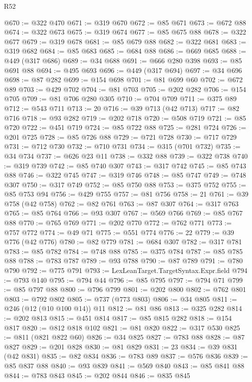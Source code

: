 \begin{lexlean}{R52}
\begin{coremodule}
@670 := @322 @470
@671 := @319 @670
@672 := @85 @671
@673 := @672 @88
@674 := @322 @673
@675 := @319 @674
@677 := @85 @675 @88
@678 := @322 @677
@679 := @319 @678
@681 := @85 @679 @88
@682 := @322 @681
@683 := @319 @682
@684 := @85 @683
@685 := @684 @88
@686 := @669 @685
@688 := @449 (@317 @686)
@689 := @34 @688
@691 := @666 @280 @398
@693 := @85 @691 @88
@694 := @495 @693
@696 := @449 (@317 @694)
@697 := @34 @696
@698 := @87 @282
@699 := @154 @698
@701 := @81 @699 @60
@702 := @672 @89
@703 := @429 @702
@704 := @81 @703
@705 := @202 @282
@706 := @154 @705
@709 := @81 @706 @280 @305
@710 := @704 @709
@711 := @375 @89
@712 := @543 @711
@713 := 20
@716 := @39 @713 (@42 @713)
@717 := @82 @716
@718 := @93 @282
@719 := @202 @718
@720 := @508 @719
@721 := @85 @720
@722 := @451 @719
@724 := @85 @722 @88
@725 := @281 @724
@726 := @201 @725
@728 := @85 @726 @88
@729 := @721 @728
@730 := @717 @729
@731 := @712 @730
@732 := @710 @731
@734 := @315 (@701 @732)
@735 := @34 @734
@737 := @626 @23 @11
@738 := @332 @88
@739 := @322 @738
@740 := @319 @739
@742 := @85 @740 @307
@743 := @317 @742
@745 := @85 @743 @88
@746 := @322 @745
@747 := @319 @746
@748 := @85 @747
@749 := @748 @307
@750 := @317 @749
@752 := @85 @750 @88
@753 := @375 @752
@755 := @85 @753 @94
@756 := @429 @755
@757 := @81 @756
@758 := 21
@761 := @39 @758 (@42 @758)
@762 := @82 @761
@763 := @87 @307
@764 := @317 @763
@765 := @85 @764
@766 := @93 @307
@767 := @569 @766
@769 := @85 @767 @88
@770 := @765 @769
@771 := @202 @770
@772 := @762 @771
@773 := @757 @772
@774 := @49 @71
@775 := @551 @774
@776 := 22
@779 := @39 @776 (@42 @776)
@780 := @82 @779
@781 := @684 @307
@782 := @317 @781
@783 := @85 @782
@784 := @748 @88
@785 := @375 @784
@787 := @85 @785 @88
@788 := @783 @787
@789 := @93 @788
@790 := @87 @789
@791 := @780 @790
@792 := @775 @791
@793 := LexLeanTarget.TargetSyntax.Expr.field
@794 := @793 @140
@795 := @794 @44
@796 := @85 @795
@797 := @794 @71
@799 := @85 @797 @88
@800 := @796 @799
@801 := @202 @800
@802 := @762 @801
@803 := @792 @802
@805 := @737 (@773 @803)
@806 := @34 @805
@811 := @246 (@12 (@10 @100 @14)) @11
@812 := @81 @86
@813 := @325 @282
@814 := @202 @813
@815 := @451 @814
@817 := @85 @815 @282
@818 := @154 @817
@820 := @812 @818 @102
@821 := @81 @820
@822 := @317 @530
@825 := @811 (@821 @822 @60)
@826 := @34 @825
@827 := @783 @88
@828 := @87 @827
@829 := @201 @828
@830 := @81 @829
@831 := 23
@834 := @39 @831 (@42 @831)
@835 := @82 @834
@836 := @783 @89
@837 := @576 @836
@839 := @85 @837 @88
@840 := @93 @839
@841 := @569 @840
@843 := @85 @841 @88
@844 := @783 @843
@845 := @202 @844
@846 := @835 @845

\end{coremodule}
\end{lexlean}

